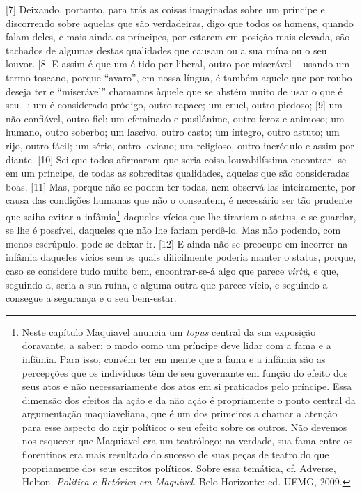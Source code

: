 {[}7{]} Deixando, portanto, para trás as coisas imaginadas sobre um
príncipe e discorrendo sobre aquelas que são verdadeiras, digo que todos
os homens, quando falam deles, e mais ainda os príncipes, por estarem em
posição mais elevada, são tachados de algumas destas qualidades que
causam ou a sua ruína ou o seu louvor. {[}8{]} E assim é que um é tido
por liberal, outro por miserável -- usando um termo toscano, porque
``avaro'', em nossa língua, é também aquele que por roubo deseja ter e
``miserável'' chamamos àquele que se abstém muito de usar o que é seu
--; um é considerado pródigo, outro rapace; um cruel, outro piedoso;
{[}9{]} um não confiável, outro fiel; um efeminado e pusilânime, outro
feroz e animoso; um humano, outro soberbo; um lascivo, outro casto; um
íntegro, outro astuto; um rijo, outro fácil; um sério, outro leviano; um
religioso, outro incrédulo e assim por diante. {[}10{]} Sei que todos
afirmaram que seria coisa louvabilíssima encontrar- se em um príncipe,
de todas as sobreditas qualidades, aquelas que são consideradas boas.
{[}11{]} Mas, porque não se podem ter todas, nem observá-las
inteiramente, por causa das condições humanas que não o consentem, é
necessário ser tão prudente que saiba evitar a infâmia\footnote{Neste
  capítulo Maquiavel anuncia um \emph{topus} central da sua exposição
  doravante, a saber: o modo como um príncipe deve lidar com a fama e a
  infâmia. Para isso, convém ter em mente que a fama e a infâmia são as
  percepções que os indivíduos têm de seu governante em função do efeito
  dos seus atos e não necessariamente dos atos em si praticados pelo
  príncipe. Essa dimensão dos efeitos da ação e da não ação é
  propriamente o ponto central da argumentação maquiaveliana, que é um
  dos primeiros a chamar a atenção para esse aspecto do agir político: o
  seu efeito sobre os outros. Não devemos nos esquecer que Maquiavel era
  um teatrólogo; na verdade, sua fama entre os florentinos era mais
  resultado do sucesso de suas peças de teatro do que propriamente dos
  seus escritos políticos. Sobre essa temática, cf. Adverse, Helton.
  \emph{Politica e Retórica em Maquivel}. Belo Horizonte: ed. UFMG,
  2009.} daqueles vícios que lhe tirariam o status, e se guardar, se lhe
é possível, daqueles que não lhe fariam perdê-lo. Mas não podendo, com
menos escrúpulo, pode-se deixar ir. {[}12{]} E ainda não se preocupe em
incorrer na infâmia daqueles vícios sem os quais dificilmente poderia
manter o status, porque, caso se considere tudo muito bem,
encontrar-se-á algo que parece \emph{virtù}, e que, seguindo-a, seria a
sua ruína, e alguma outra que parece vício, e seguindo-a consegue a
segurança e o seu bem-estar.

